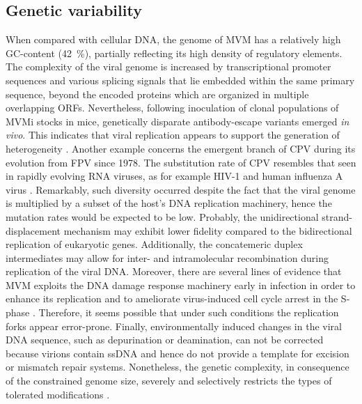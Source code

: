 \subsection{Genetic variability}

When compared with cellular DNA, the genome of MVM has a relatively high GC-content (42~\%), partially reflecting its high density of regulatory elements. The complexity of the viral genome is increased by transcriptional promoter sequences and various splicing signals that lie embedded within the same primary sequence, beyond the encoded proteins which are organized in multiple overlapping ORFs. Nevertheless, following inoculation of clonal populations of MVMi stocks in mice, genetically disparate antibody-escape variants emerged \textit{in vivo}. This indicates that viral replication appears to support the generation of heterogeneity \cite{pmid12552010}. Another example concerns the emergent branch of CPV during its evolution from FPV since 1978. The substitution rate of CPV resembles that seen in rapidly evolving RNA viruses, as for example HIV-1 and human influenza A virus \cite{pmid15626758}. Remarkably, such diversity occurred despite the fact that the viral genome is multiplied by a subset of the host's DNA replication machinery, hence the mutation rates would be expected to be low. Probably, the unidirectional strand-displacement mechanism may exhibit lower fidelity compared to the bidirectional replication of eukaryotic genes. Additionally, the concatemeric duplex intermediates may allow for inter- and intramolecular recombination during replication of the viral DNA. Moreover, there are several lines of evidence that MVM exploits the DNA damage response machinery early in infection in order to enhance its replication and to ameliorate virus-induced cell cycle arrest in the S-phase \cite{pmid20949077}. Therefore, it seems possible that under such conditions the replication forks appear error-prone. Finally, environmentally induced changes in the viral DNA sequence, such as depurination or deamination, can not be corrected because virions contain ssDNA and hence do not provide a template for excision or mismatch repair systems. Nonetheless, the genetic complexity, in consequence of the constrained genome size, severely and selectively restricts the types of tolerated modifications \cite{telomere}.   


